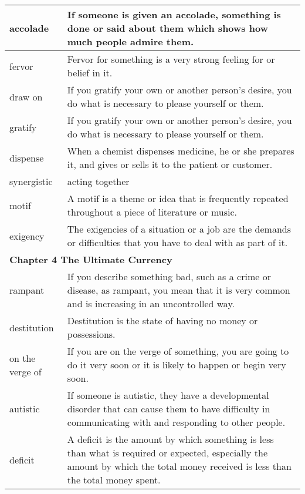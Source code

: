 \documentclass{article}
\begin{document}
\begin{center}
\begin{longtable}{|l|p{9cm}|}
\hline
accolade
&
If someone is given an accolade, something is done or said about them which shows how much people admire them.
\\

\hline
fervor
&
Fervor for something is a very strong feeling for or belief in it.
\\

\hline
draw on
&
If you gratify your own or another person's desire, you do what is necessary to please yourself or them.
\\

\hline
gratify
&
If you gratify your own or another person's desire, you do what is necessary to please yourself or them.
\\

\hline
dispense
&
When a chemist dispenses medicine, he or she prepares it, and gives or sells it to the patient or customer.
\\

\hline
synergistic
&
acting together
\\

\hline
motif
&
A motif is a theme or idea that is frequently repeated throughout a piece of literature or music.
\\

\hline
exigency
&
The exigencies of a situation or a job are the demands or difficulties that you have to deal with as part of it.
\\

\hline
\multicolumn{2}{|l|}{\textbf{Chapter 4 The Ultimate Currency}}\\
\hline
rampant
&
If you describe something bad, such as a crime or disease, as rampant, you mean that it is very common and is increasing in an uncontrolled way.
\\

\hline
destitution
&
Destitution is the state of having no money or possessions.
\\

\hline
on the verge of
&
If you are on the verge of something, you are going to do it very soon or it is likely to happen or begin very soon.
\\

\hline
autistic
&
If someone is autistic, they have a developmental disorder that can cause them to have difficulty in communicating with and responding to other people.
\\

\hline
deficit
&
A deficit is the amount by which something is less than what is required or expected, especially the amount by which the total money received is less than the total money spent.
\\


\end{longtable}
\end{center}
\end{document}
